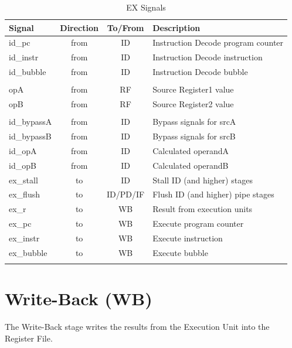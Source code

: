 \begin{longtable}[]{@{}lccl@{}}
	\toprule
	\textbf{Signal} & \textbf{Direction} & \textbf{To/From} & \textbf{Description}\tabularnewline
	\midrule

	\endhead
		id\_pc      & from & ID       & Instruction Decode program counter\\
		id\_instr   & from & ID       & Instruction Decode instruction\\
		id\_bubble  & from & ID       & Instruction Decode bubble\\
		            &      &          & \\
		opA         & from & RF       & Source Register1 value\\
		opB         & from & RF       & Source Register2 value\\
		            &      &          & \\
		id\_bypassA & from & ID       & Bypass signals for srcA\\
		id\_bypassB & from & ID       & Bypass signals for srcB\\
		id\_opA     & from & ID       & Calculated operandA\\
		id\_opB     & from & ID       & Calculated operandB\\
		ex\_stall   & to   & ID       & Stall ID (and higher) stages\\
		ex\_flush   & to   & ID/PD/IF & Flush ID (and higher) pipe stages\\
		ex\_r       & to   & WB       & Result from execution units\\
		ex\_pc      & to   & WB       & Execute program counter\\
		ex\_instr   & to   & WB       & Execute instruction\\
		ex\_bubble  & to   & WB       & Execute bubble\\
	\bottomrule
	\caption{EX Signals}
	\label{tab:ex-signals}
\end{longtable}

\pagebreak

\section{Write-Back (WB)}\label{write-back-wb-1}

The Write-Back stage writes the results from the Execution Unit into the Register File.

